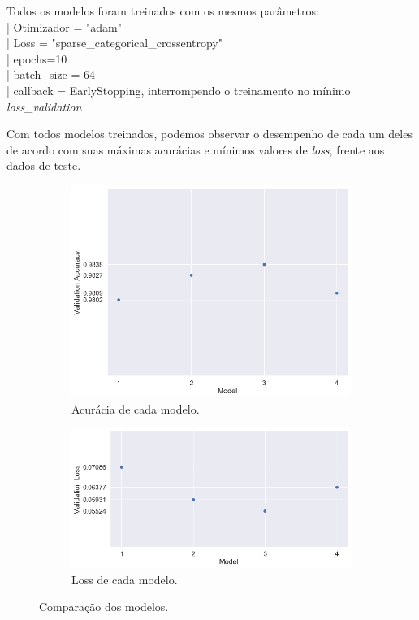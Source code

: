 \documentclass[12pt]{article}
\begin{document}
Todos os modelos foram treinados com os mesmos parâmetros:\\
| Otimizador = "adam"\\
| Loss = "sparse\_categorical\_crossentropy"\\
| epochs=10\\
| batch\_size = 64 \\
| callback = EarlyStopping, interrompendo o treinamento no mínimo \textit{loss\_validation}\\
\pagebreak

Com todos modelos treinados, podemos observar o desempenho de cada um deles de acordo com suas máximas acurácias e mínimos valores de \textit{loss}, frente aos dados de teste.

\begin{figure}[H]
	\begin{subfigure}{0.49\linewidth}
		\centering
		\includegraphics[width=\linewidth]{Imagens/mlp_acc.png}
		\caption{Acurácia de cada modelo.}
		\label{fig:mlp_acc}
	\end{subfigure}
	\hfill
	\begin{subfigure}{0.49\linewidth}
		\centering
		\includegraphics[width=\linewidth]{Imagens/mlp_loss.png}
		\caption{Loss de cada modelo.}
		\label{fig:mlp_loss}
	\end{subfigure}
	\caption{Comparação dos modelos.}
	\label{fig:comp_models}
\end{figure}
\end{document}
